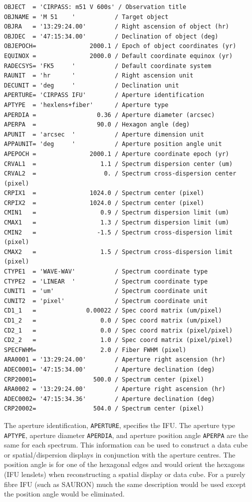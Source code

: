 \documentclass[twoside,11pt]{article}
\newcommand{\htmlref}[2]{#1}
\begin{document}
\begin{\htmlonly}
\small\begin{verbatim}
OBJECT  = 'CIRPASS: m51 V 600s' / Observation title
OBJNAME = 'M 51    '           / Target object
OBJRA   = '13:29:24.00'        / Right ascension of object (hr)
OBJDEC  = '47:15:34.00'        / Declination of object (deg)
OBJEPOCH=               2000.1 / Epoch of object coordinates (yr)
EQUINOX =               2000.0 / Default coordinate equinox (yr)
RADECSYS= 'FK5     '           / Default coordinate system
RAUNIT  = 'hr      '           / Right ascension unit
DECUNIT = 'deg     '           / Declination unit
APERTURE= 'CIRPASS IFU'        / Aperture identification
APTYPE  = 'hexlens+fiber'      / Aperture type
APERDIA =                 0.36 / Aperture diameter (arcsec)
APERPA  =                 90.0 / Hexagon angle (deg)
APUNIT  = 'arcsec  '           / Aperture dimension unit
APPAUNIT= 'deg     '           / Aperture position angle unit
APEPOCH =               2000.1 / Aperture coordinate epoch (yr)
CRVAL1  =                  1.1 / Spectrum dispersion center (um)
CRVAL2  =                   0. / Spectrum cross-dispersion center (pixel)
CRPIX1  =               1024.0 / Spectrum center (pixel)
CRPIX2  =               1024.0 / Spectrum center (pixel)
CMIN1   =                  0.9 / Spectrum dispersion limit (um)
CMAX1   =                  1.3 / Spectrum dispersion limit (um)
CMIN2   =                 -1.5 / Spectrum cross-dispersion limit (pixel)
CMAX2   =                  1.5 / Spectrum cross-dispersion limit (pixel)
CTYPE1  = 'WAVE-WAV'           / Spectrum coordinate type
CTYPE2  = 'LINEAR  '           / Spectrum coordinate type
CUNIT1  = 'um'                 / Spectrum coordinate unit
CUNIT2  = 'pixel'              / Spectrum coordinate unit
CD1_1   =              0.00022 / Spec coord matrix (um/pixel)
CD1_2   =                  0.0 / Spec coord matrix (um/pixel)
CD2_1   =                  0.0 / Spec coord matrix (pixel/pixel)
CD2_2   =                  1.0 / Spec coord matrix (pixel/pixel)
SPECFWHM=                  2.0 / Fiber FWHM (pixel)
ARA0001 = '13:29:24.00'        / Aperture right ascension (hr)
ADEC0001= '47:15:34.00'        / Aperture declination (deg)
CRP20001=                500.0 / Spectrum center (pixel)
ARA0002 = '13:29:24.00'        / Aperture right ascension (hr)
ADEC0002= '47:15:34.36'        / Aperture declination (deg)
CRP20002=                504.0 / Spectrum center (pixel)
\end{verbatim}\normalsize

The aperture identification, {\tt APERTURE}, specifies the IFU.  The
aperture type {\tt APTYPE}, aperture diameter {\tt APERDIA}, and
aperture position angle {\tt APERPA} are the same for each spectrum.
This information can be used to \htmlref{construct a data
cube}{sc16_mef2cub} or
spatial/dispersion displays in conjunction with the aperture centres.
The position angle is for one of the hexagonal edges and would orient
the hexagons (IFU lenslets) when reconstructing a spatial display or
data cube.  For a purely fibre IFU (such as SAURON) much the same
description would be used except the position angle would be
eliminated.


\end{\htmlonly}
\end{document}
